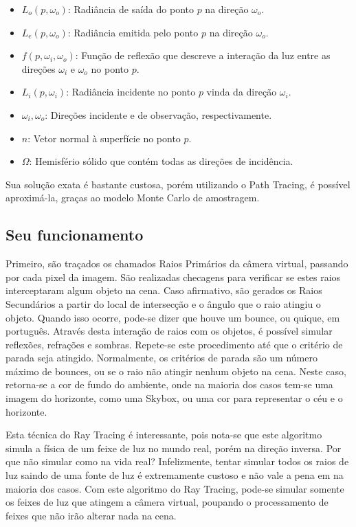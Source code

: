 \documentclass[journal]{IEEEtran}
\begin{document}
\vspace{10pt}
\begin{itemize}
  \item $L_o(p, \omega_o)$: Radiância de saída do ponto $p$ na direção $\omega_o$.
  \item $L_e(p, \omega_o)$: Radiância emitida pelo ponto $p$ na direção $\omega_o$.
  \item $f(p, \omega_i, \omega_o)$: Função de reflexão que descreve a interação da luz entre as direções $\omega_i$ e $\omega_o$ no ponto $p$.
  \item $L_i(p, \omega_i)$: Radiância incidente no ponto $p$ vinda da direção $\omega_i$.
  \item $\omega_i, \omega_o$: Direções incidente e de observação, respectivamente.
  \item $n$: Vetor normal à superfície no ponto $p$.
  \item $\Omega$: Hemisfério sólido que contém todas as direções de incidência.
\end{itemize}

Sua solução exata é bastante custosa, porém utilizando o Path Tracing, é possível
aproximá-la, graças ao modelo Monte Carlo de amostragem.

\subsection{Seu funcionamento}
Primeiro, são traçados os chamados Raios Primários da câmera virtual, passando por cada pixel 
da imagem. São realizadas checagens para verificar se estes raios interceptaram algum 
objeto na cena.
Caso afirmativo, são gerados os Raios Secundários a partir do local de intersecção e
o ângulo que o raio atingiu o objeto. Quando isso ocorre, pode-se dizer que houve um
bounce, ou quique, em português. Através desta interação de raios com os objetos, é 
possível simular reflexões, refrações e sombras. Repete-se este procedimento até que
o critério de parada seja atingido. Normalmente, os critérios de parada são um número
máximo de bounces, ou se o raio não atingir nenhum objeto na cena. Neste caso, 
retorna-se a cor de fundo do ambiente, onde na maioria dos casos tem-se uma imagem
do horizonte, como uma Skybox, ou uma cor para representar o céu e o horizonte.

Esta técnica do Ray Tracing é interessante, pois nota-se que este algoritmo simula a física
de um feixe de luz no mundo real, porém na direção inversa. Por que não simular
como na vida real? Infelizmente, tentar simular todos os raios de luz saindo de uma fonte
de luz é extremamente custoso e não vale a pena em na maioria dos casos. Com este
algoritmo do Ray Tracing, pode-se simular somente os feixes de luz que atingem
a câmera virtual, poupando o processamento de feixes que não irão alterar nada
na cena.
\end{document}
